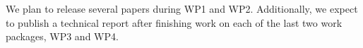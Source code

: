 \documentclass[a4paper,11pt]{article}
\begin{document}
\begin{landscape}
We plan to release several papers during WP1 and WP2. Additionally, we expect to publish a technical report after finishing work on each of the last two work packages, WP3 and WP4. 




\end{landscape}
\end{document}
